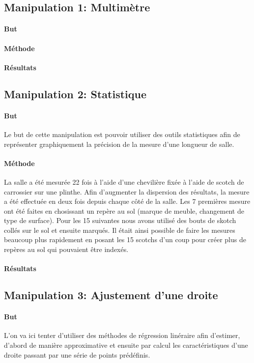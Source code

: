 \subsection{Manipulation 1: Multimètre}
\paragraph{But}
\paragraph{Méthode}
\paragraph{Résultats}
\subsection{Manipulation 2: Statistique}
\paragraph{But}
Le but de cette manipulation est pouvoir utiliser des outils statistiques afin de représenter graphiquement la précision de la mesure d'une longueur de salle.
\paragraph{Méthode}
La salle a été mesurée 22 fois à l'aide d'une chevilière fixée à l'aide de scotch de carrossier sur une plinthe.
Afin d'augmenter la dispersion des résultats, la mesure a été effectuée en deux fois depuis chaque côté de la salle.
Les 7 premières mesure ont été faites en chosissant un repère au sol (marque de meuble, changement de type de surface).
Pour les 15 suivantes nous avons utilisé des bouts de skotch collés sur le sol et ensuite marqués. Il était ainsi possible de faire les mesures beaucoup plus rapidement en posant les 15 scotchs d'un coup pour créer plus de repères au sol qui pouvaient être indexés.
\paragraph{Résultats}
\subsection{Manipulation 3: Ajustement d'une droite}
\paragraph{But}
L'on va ici tenter d'utiliser des méthodes de régression linéraire afin d'estimer, d'abord de manière approximative et ensuite par calcul les caractéristiques d'une droite passant par une série de points prédéfinis.
